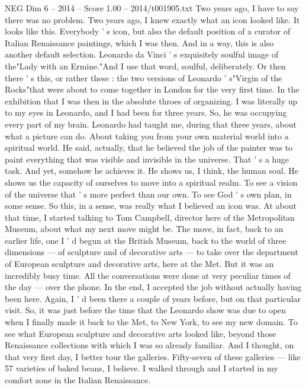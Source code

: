 \begin{textsample}{NEG Dim 6 – 2014 – Score 1.00 – 2014/t001905.txt}  \label{ex:f6_neg_031}
Two years ago, I have to say there was no problem.
Two years ago, I knew exactly what an icon looked like.
It looks like this.
Everybody ' s icon, but also the default position of a curator of Italian Renaissance paintings, which I was then.
And in a way, this is also another default selection.
Leonardo da Vinci ' s exquisitely soulful image of the"Lady with an Ermine."And I use that word, soulful, deliberately.
Or then there ' s this, or rather these : the two versions of Leonardo ' s"Virgin of the Rocks"that were about to come together in London for the very first time.
In the exhibition that I was then in the absolute throes of organizing.
I was literally up to my eyes in Leonardo, and I had been for three years.
So, he was occupying every part of my brain.
Leonardo had taught me, during that three years, about what a picture can do.
About taking you from your own material world into a spiritual world.
He said, actually, that he believed the job of the painter was to paint everything that was visible and invisible in the universe.
That ' s a huge task.
And yet, somehow he achieves it.
He shows us, I think, the human soul.
He shows us the capacity of ourselves to move into a spiritual realm.
To see a vision of the universe that ' s more perfect than our own.
To see God ' s own plan, in some sense.
So this, in a sense, was really what I believed an icon was.
At about that time, I started talking to Tom Campbell, director here of the Metropolitan Museum, about what my next move might be.
The move, in fact, back to an earlier life, one I ' d begun at the British Museum, back to the world of three dimensions — of sculpture and of decorative arts — to take over the department of European sculpture and decorative arts, here at the Met.
But it was an incredibly busy time.
All the conversations were done at very peculiar times of the day — over the phone.
In the end, I accepted the job without actually having been here.
Again, I ' d been there a couple of years before, but on that particular visit.
So, it was just before the time that the Leonardo show was due to open when I finally made it back to the Met, to New York, to see my new domain.
To see what European sculpture and decorative arts looked like, beyond those Renaissance collections with which I was so already familiar.
And I thought, on that very first day, I better tour the galleries.
Fifty-seven of these galleries — like 57 varieties of baked beans, I believe.
I walked through and I started in my comfort zone in the Italian Renaissance.

\end{textsample}
